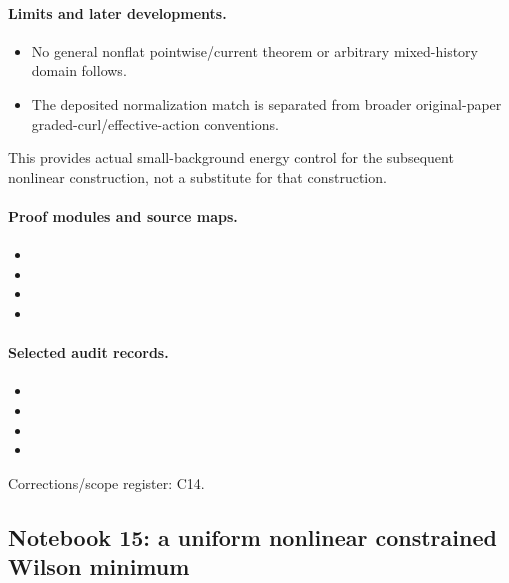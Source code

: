 \documentclass[11pt]{article}
\theoremstyle{remark}
\begin{document}
\paragraph{Limits and later developments.}
\begin{itemize}
\item No general nonflat pointwise/current theorem or arbitrary mixed-history domain follows.
\item The deposited normalization match is separated from broader original-paper graded-curl/effective-action conventions.
\end{itemize}

This provides actual small-background energy control for the subsequent nonlinear construction, not a substitute for that construction.

\paragraph{Proof modules and source maps.}
\begingroup\small
\begin{itemize}
\item {}
\item {}
\item {}
\item {}
\end{itemize}
\endgroup

\paragraph{Selected audit records.}
\begingroup\small
\begin{itemize}
\item {}
\item {}
\item {}
\item {}
\end{itemize}
\endgroup
Corrections/scope register: C14.\par

\subsection{Notebook 15: a uniform nonlinear constrained Wilson minimum}
\label{hnc-15}
\noindent{}\par
\end{document}
